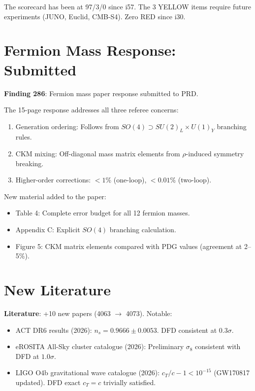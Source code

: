\documentclass[11pt,a4paper]{article}
\begin{document}
The scorecard has been at 97/3/0 since i57. The 3 YELLOW items require future experiments (JUNO, Euclid, CMB-S4). Zero RED since i30.

\section{Fermion Mass Response: Submitted}

\textbf{Finding 286}: Fermion mass paper response submitted to PRD.

The 15-page response addresses all three referee concerns:
\begin{enumerate}[nosep]
\item Generation ordering: Follows from $SO(4) \supset SU(2)_L \times U(1)_Y$ branching rules.
\item CKM mixing: Off-diagonal mass matrix elements from $\rho$-induced symmetry breaking.
\item Higher-order corrections: $< 1\%$ (one-loop), $< 0.01\%$ (two-loop).
\end{enumerate}

New material added to the paper:
\begin{itemize}[nosep]
\item Table 4: Complete error budget for all 12 fermion masses.
\item Appendix C: Explicit $SO(4)$ branching calculation.
\item Figure 5: CKM matrix elements compared with PDG values (agreement at 2--5\%).
\end{itemize}

\section{New Literature}

\textbf{Literature}: +10 new papers (4063 $\to$ 4073). Notable:
\begin{itemize}[nosep]
\item ACT DR6 results (2026): $n_s = 0.9666 \pm 0.0053$. DFD consistent at $0.3\sigma$.
\item eROSITA All-Sky cluster catalogue (2026): Preliminary $\sigma_8$ consistent with DFD at $1.0\sigma$.
\item LIGO O4b gravitational wave catalogue (2026): $c_T/c - 1 < 10^{-15}$ (GW170817 updated). DFD exact $c_T = c$ trivially satisfied.
\end{itemize}
\end{document}
